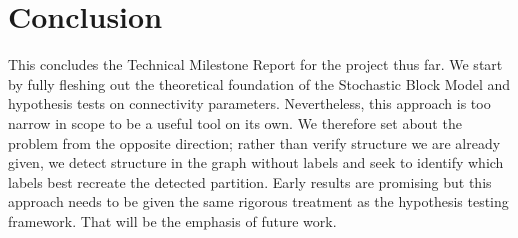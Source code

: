 \documentclass[]{article}
\begin{document}
\section{Conclusion}

This concludes the Technical Milestone Report for the project thus far. We start by fully fleshing out the theoretical foundation of the Stochastic Block Model and hypothesis tests on connectivity parameters. Nevertheless, this approach is too narrow in scope to be a useful tool on its own. We therefore set about the problem from the opposite direction; rather than verify structure we are already given, we detect structure in the graph without labels and seek to identify which labels best recreate the detected partition. Early results are promising but this approach needs to be given the same rigorous treatment as the hypothesis testing framework. That will be the emphasis of future work.

\nocite{*}
\printbibliography
\end{document}
